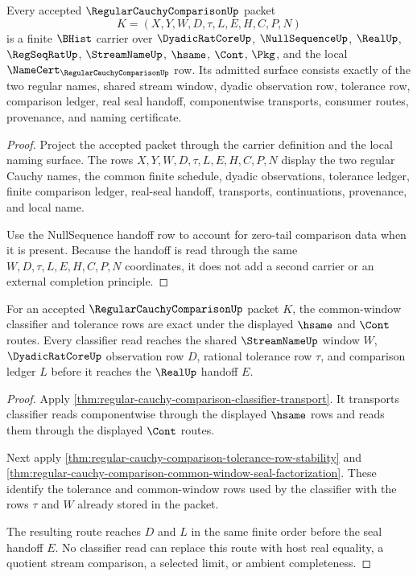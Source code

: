 \begin{theorem}
\label{thm:regular-cauchy-comparison-carrier-admission}
Every accepted $\RegularCauchyComparisonUp$ packet
$$
K=(X,Y,W,D,\tau,L,E,H,C,P,N)
$$
is a finite $\BHist$ carrier over $\DyadicRatCoreUp$, $\NullSequenceUp$, $\RealUp$, $\RegSeqRatUp$, $\StreamNameUp$, $\hsame$, $\Cont$, $\Pkg$, and the local $\NameCert_{\RegularCauchyComparisonUp}$ row. Its admitted surface consists exactly of the two regular names, shared stream window, dyadic observation row, tolerance row, comparison ledger, real seal handoff, componentwise transports, consumer routes, provenance, and naming certificate.
\end{theorem}
\begin{proof}
Project the accepted packet through the carrier definition and the local naming surface. The rows $X,Y,W,D,\tau,L,E,H,C,P,N$ display the two regular Cauchy names, the common finite schedule, dyadic observations, tolerance ledger, finite comparison ledger, real-seal handoff, transports, continuations, provenance, and local name.

Use the NullSequence handoff row to account for zero-tail comparison data when it is present. Because the handoff is read through the same $W,D,\tau,L,E,H,C,P,N$ coordinates, it does not add a second carrier or an external completion principle.
\end{proof}

\begin{theorem}
\label{thm:regular-cauchy-comparison-classifier-window-exactness}
For an accepted $\RegularCauchyComparisonUp$ packet $K$, the common-window classifier and tolerance rows are exact under the displayed $\hsame$ and $\Cont$ routes. Every classifier read reaches the shared $\StreamNameUp$ window $W$, $\DyadicRatCoreUp$ observation row $D$, rational tolerance row $\tau$, and comparison ledger $L$ before it reaches the $\RealUp$ handoff $E$.
\end{theorem}
\begin{proof}
Apply \autoref{thm:regular-cauchy-comparison-classifier-transport}. It transports classifier reads componentwise through the displayed $\hsame$ rows and reads them through the displayed $\Cont$ routes.

Next apply \autoref{thm:regular-cauchy-comparison-tolerance-row-stability} and \autoref{thm:regular-cauchy-comparison-common-window-seal-factorization}. These identify the tolerance and common-window rows used by the classifier with the rows $\tau$ and $W$ already stored in the packet.

The resulting route reaches $D$ and $L$ in the same finite order before the seal handoff $E$. No classifier read can replace this route with host real equality, a quotient stream comparison, a selected limit, or ambient completeness.
\end{proof}

